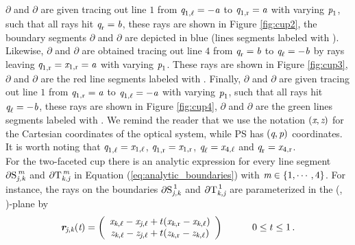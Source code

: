  $\partial$ and $\partial$ are given tracing out line $1$ from
 $\textit{q}_{1, \ell}= -\textit{a}$ to $\textit{q}_{1, \textrm{r}}= \textit{a}$
 with varying $\textit{p}_1$, such that all rays hit $\textit{q}_{\textrm{r}} = \textit{b}$, these rays are shown in Figure \ref{fig:cup2}, the boundary segments
 $\partial$ and $\partial$ are depicted in blue (lines segments labeled with ).
 Likewise, $\partial$ and $\partial$ are obtained tracing out line $4$ from
$\textit{q}_{\textrm{r}}= \textit{b}$ to $\textit{q}_{\ell}= -\textit{b}$ 
 by rays leaving $\textit{q}_{1, \textrm{r}}=\textit{x}_{1, \textrm{r}} = \textit{a}$ with varying $\textit{p}_{1}$. These rays are shown in Figure \ref{fig:cup3}, 
 $\partial$ and $\partial$ are the red line segments labeled with .
  Finally, $\partial$ and $\partial$ are given tracing out line $1$ from
$\textit{q}_{1, \textrm{r}} = \textit{a}$ to  $\textit{q}_{1, \ell} = -\textit{a}$ 
 with varying $\textit{p}_{1}$, such that all rays hit $\textit{q}_{\ell} = -\textit{b}$, these rays are shown in Figure \ref{fig:cup4}, 
 $\partial$ and $\partial$ are the green lines segments labeled with . 
We remind the reader that we use the notation $(\textit{x}, \textit{z})$ for the Cartesian coordinates of the optical system, while PS has $(\textit{q}, \textit{p})$ coordinates. 
It is worth noting that  $\textit{q}_{1, \ell}=\textit{x}_{1, \ell}$,  $\textit{q}_{1, \textrm{r}}=\textit{x}_{1, \textrm{r}}$,  
$\textit{q}_{\ell}=\textit{x}_{4, \ell}$ and  $\textit{q}_{\textrm{r}}=\textit{x}_{4, \textrm{r}}$.\\ \indent
 For the two-faceted cup there is an analytic expression for every line segment $\partial\mbox{$\textup{S}_{\textit{\textit{j},\textit{k}}}^{\textit{\,m}}$}$ and
 $\partial\mbox{$\textup{T}_{\textit{\textit{k},\textit{j}}}^{\textit{\,m}}$}$ in Equation (\ref{eq:analytic_boundaries}) with $\textit{m}\in\{1, \cdots, 4\}$.
 For instance, the rays on the boundaries $\partial\mbox{$\textup{S}_{\textit{\textit{j},\textit{k}}}^{\,1}$}$ and $\partial \mbox{$\textup{T}_{\textit{\textit{k},\textit{j}}}^{\,1}$}$
  are parameterized in the (, )-plane by
 \begin{equation}
\label{extremes_rays}
\textit{\textbf{r}}_{\textit{\textit{j}}, \textit{\textit{k}}}(\textit{t})=
\left( \begin{array}{cc}
\textit{x}_{\textit{\textit{k}}, \ell}-\textit{x}_{\textit{\textit{j}}, \ell}+t(\textit{x}_{\textit{\textit{k}}, \textrm{r}}-\textit{x}_{\textit{\textit{k}}, \ell}) \\
\textit{z}_{\textit{\textit{k}}, \ell}-\textit{z}_{\textit{\textit{j}}, \ell}+t(\textit{z}_{\textit{\textit{k}}, \textrm{r}}-\textit{z}_{\textit{\textit{k}},\ell})
\end{array} \right) \qquad \quad 0\leq t\leq 1\,.
\end{equation}

